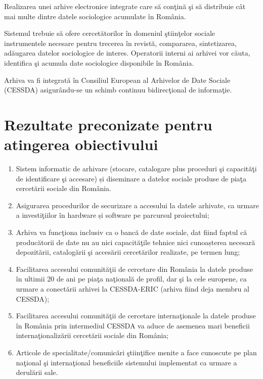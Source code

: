 \documentclass[a4paper, 10pt]{article}
\begin{document}
{Realizarea unei arhive electronice integrate care s\u{a}
con\c{t}in\u{a} \c{s}i s\u{a} distribuie c\^at mai multe dintre 
datele sociologice acumulate \^in Rom\^ania.

\medskip

Sistemul trebuie s\u{a} ofere cercet\u{a}torilor \^in domeniul \c{s}tiin\c{t}elor sociale instrumentele necesare pentru
trecerea \^in revist\u{a}, compararea, sintetizarea, ad\u{a}ugarea datelor sociologice de interes. 
Operatorii interni ai arhivei vor c\u{a}uta, 
identifica \c{s}i acumula date sociologice disponibile \^in Rom\^ania.

\medskip

Arhiva va fi integrat\u{a} \^in Consiliul European al Arhivelor de Date Sociale (CESSDA) asigur\^andu-se un schimb
continuu bidirec\c{t}ional de informa\c{t}ie.

\section{Rezultate preconizate pentru atingerea obiectivului}

\begin{enumerate}
\item {
Sistem informatic de arhivare (stocare, catalogare plus proceduri \c{s}i capacit\u{a}\c{t}i de identificare \c{s}i
accesare) \foreignlanguage{romanian}{\c{s}}i diseminare a datelor sociale produse de pia\c{t}a cercet\u{a}rii sociale
din Rom\^ania.}
\item {
Asigurarea procedurilor de securizare a accesului la datele arhivate, ca urmare a investi\c{t}iilor \^in hardware
\foreignlanguage{romanian}{\c{s}}i software pe parcursul proiectului;}
\item {
\foreignlanguage{romanian}{Arhiva }va func\c{t}iona inclusiv ca o banc\u{a} de date sociale, dat fiind faptul c\u{a}
produc\u{a}torii de date nu au nici capacit\u{a}\c{t}ile tehnice nici \foreignlanguage{romanian}{cunoa\c{s}terea}
necesar\u{a} depozit\u{a}rii, catalog\u{a}rii \c{s}i acces\u{a}rii cercet\u{a}rilor realizate, pe termen lung;}
\item {
Facilitarea accesului comunit\u{a}\c{t}ii de cercetare din Rom\^ania la datele produse \^in ultimii 20 de ani pe
pia\c{t}a na\c{t}ional\u{a} de profil, dar \c{s}i la cele europene, ca urmare a conect\u{a}rii arhivei la CESSDA-ERIC
(arhiva fiind deja membru al CESSDA);}
\item {
Facilitarea accesului comunit\u{a}\c{t}ii de cercetare interna\c{t}ionale la datele produse \^in Rom\^ania prin
intermediul CESSDA va aduce de asemenea mari beneficii interna\c{t}ionaliz\u{a}rii cercet\u{a}rii sociale din
Rom\^ania;}
\item {
Articole de specialitate/comunic\u{a}ri \c{s}tiin\c{t}ifice menite a face cunoscute pe plan na\c{t}ional \c{s}i
interna\c{t}ional beneficiile sistemului implementat ca urmare a derul\u{a}rii sale.}
\end{enumerate}

}
\end{document}
